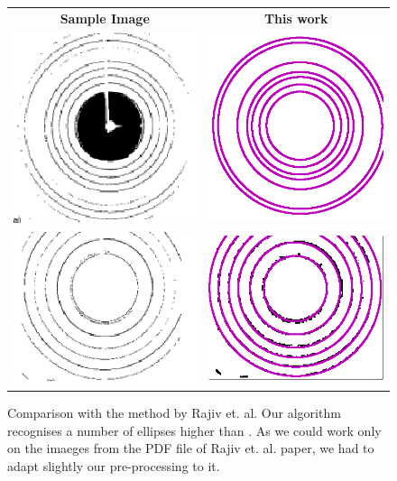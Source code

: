 \documentclass[preprint]{iucr}              %
\begin{document}
\begin{figure}
\centering
\begin{tabular}{cc}
\textbf{Sample Image} & \textbf{This work}
\\
\includegraphics[width=.35\linewidth]{Comparisons/rajiv1.png}
&
\includegraphics[width=.35\linewidth]{Comparisons/rajiv1OurResult.png}
\\
\includegraphics[width=.35\linewidth]{Comparisons/rajiv2.png}
&
\includegraphics[width=.35\linewidth]{Comparisons/rajiv2OurResult.png}
\end{tabular}

\label{fig:compare_rajiv}
\caption {Comparison with the method by Rajiv et. al.
Our algorithm recognises a number of ellipses higher than \cite{PDJ:8503397}. 
As we could work only on the imaeges from the PDF file of Rajiv et. al. paper,
we had to adapt slightly our pre-processing to it.} 
\end{figure}
\end{document}
